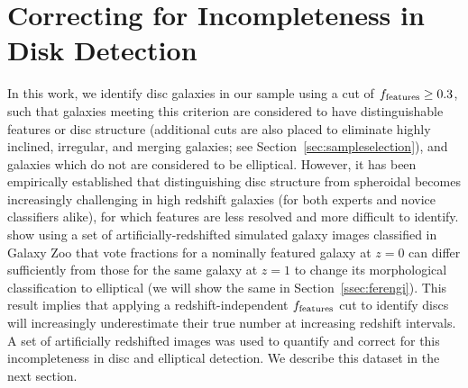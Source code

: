 \documentclass[useAMS,usenatbib]{mn2e}
\begin{document}
\section{Correcting for Incompleteness in Disk Detection}
\label{sec:correction}
In this work, we identify disc galaxies in our sample using a cut of $f_{\rm features}\ge0.3$, such that galaxies meeting this criterion are considered to have distinguishable features or disc structure (additional cuts are also placed to eliminate highly inclined, irregular, and merging galaxies; see Section~\ref{sec:sampleselection}), and galaxies which do not are considered to be elliptical. However, it has been empirically established that distinguishing disc structure from spheroidal becomes increasingly challenging in high redshift galaxies (for both experts and novice classifiers alike), for which features are less resolved and more difficult to identify. \citet{Willett2017} show using a set of artificially-redshifted simulated galaxy images classified in Galaxy Zoo that vote fractions for a nominally featured galaxy at $z=0$ can differ sufficiently from those for the same galaxy at $z=1$ to change its morphological classification to elliptical (we will show the same in Section~\ref{ssec:ferengi}).  This result implies that applying a redshift-independent $f_{\rm features}$ cut to identify discs will increasingly underestimate their true number at increasing redshift intervals. A set of artificially redshifted images was used to quantify and correct for this incompleteness in disc and elliptical detection. We describe this dataset in the next section.
 
\end{document}
